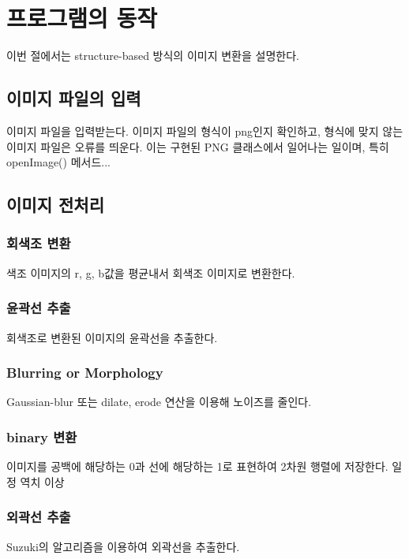 \documentclass[conference]{IEEEtran}
\begin{document}
\section{프로그램의 동작}

이번 절에서는 structure-based 방식의 이미지 변환을 설명한다.

\subsection{이미지 파일의 입력}

이미지 파일을 입력받는다. 이미지 파일의 형식이 png인지 확인하고, 형식에 맞지 않는 이미지 파일은 오류를 띄운다.
이는  구현된 PNG 클래스에서 일어나는 일이며, 특히 openImage() 메서드...

\subsection{이미지 전처리}

\subsubsection{회색조 변환}

색조 이미지의 r, g, b값을 평균내서 회색조 이미지로 변환한다.

\subsubsection{윤곽선 추출}

회색조로 변환된 이미지의 윤곽선을 추출한다.

\subsubsection{Blurring or Morphology}

Gaussian-blur 또는 dilate, erode 연산을 이용해 노이즈를 줄인다.

\subsubsection{binary 변환}

이미지를 공백에 해당하는 0과 선에 해당하는 1로 표현하여 2차원 행렬에 저장한다.
일정 역치 이상 

\subsubsection{외곽선 추출}
Suzuki의 알고리즘\cite{suzuki}을 이용하여 외곽선을 추출한다.
\end{document}
